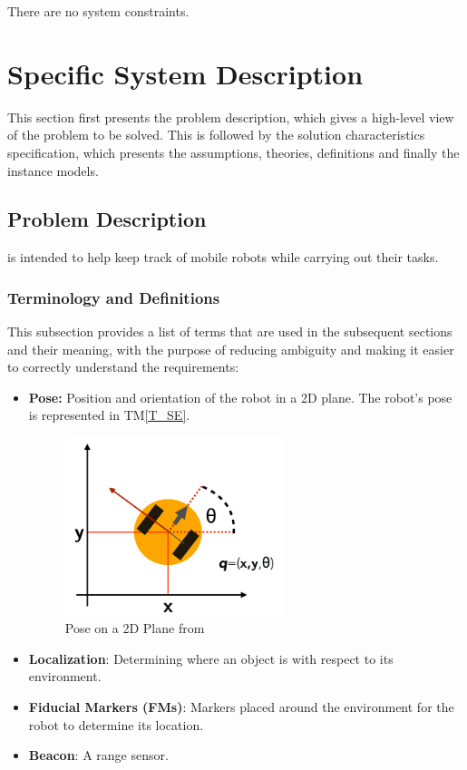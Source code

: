 \documentclass[12pt]{article}
\newcommand{\tref}[1]{TM\ref{#1}}
\begin{document}
There are no system constraints.

\section{Specific System Description}

This section first presents the problem description, which gives a high-level
view of the problem to be solved.  This is followed by the solution characteristics
specification, which presents the assumptions, theories, definitions and finally
the instance models.

\subsection{Problem Description}\label{Sec_pd}

\progname is intended to help keep track of mobile robots while carrying out their tasks.

\subsubsection{Terminology and  Definitions}

This subsection provides a list of terms that are used in the subsequent
sections and their meaning, with the purpose of reducing ambiguity and making it
easier to correctly understand the requirements:

\begin{itemize}

\item \textbf{Pose:} Position and orientation of the robot in a 2D plane. The robot's pose is represented in \tref{T_SE}.
\begin{figure}[h!]
  \begin{center}
   \includegraphics[width=0.6\textwidth]{pose.png}
  \caption{Pose on a 2D Plane from \cite{DiCaro2017}}
  \label{Fig_Pose} 
  \end{center}
  \end{figure}



\item \textbf{Localization}: Determining where an object is with respect to its environment.
\item \textbf{Fiducial Markers (FMs)}: Markers placed around the environment for the robot to determine its location.
\item \textbf{Beacon}: A range sensor.

\end{itemize}
\end{document}

